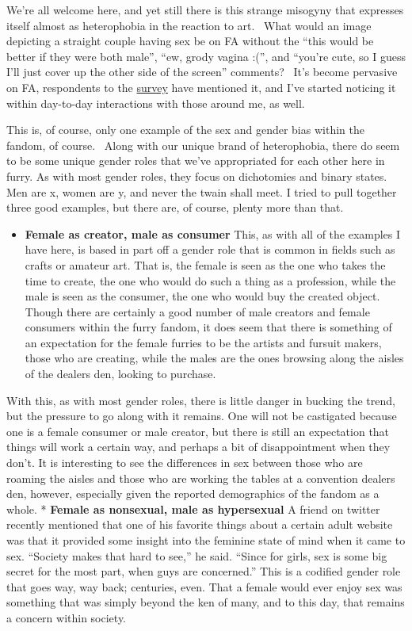 We're all welcome here, and yet still there is this strange misogyny
that expresses itself almost as heterophobia in the reaction to art.
~What would an image depicting a straight couple having sex be on FA
without the ``this would be better if they were both male'', ``ew, grody
vagina :('', and ``you're cute, so I guess I'll just cover up the other
side of the screen'' comments? ~It's become pervasive on FA, respondents
to the
\href{http://survey.adjectivespecies.com/sexuality-and-gender/}{survey}
have mentioned it, and I've started noticing it within day-to-day
interactions with those around me, as well.

This is, of course, only one example of the sex and gender bias within
the fandom, of course. ~Along with our unique brand of heterophobia,
there do seem to be some unique gender roles that we've appropriated for
each other here in furry. As with most gender roles, they focus on
dichotomies and binary states. Men are x, women are y, and never the
twain shall meet. I tried to pull together three good examples, but
there are, of course, plenty more than that.

\begin{itemize}
\tightlist
\item
  \textbf{Female as creator, male as consumer} This, as with all of the
  examples I have here, is based in part off a gender role that is
  common in fields such as crafts or amateur art. That is, the female is
  seen as the one who takes the time to create, the one who would do
  such a thing as a profession, while the male is seen as the consumer,
  the one who would buy the created object. Though there are certainly a
  good number of male creators and female consumers within the furry
  fandom, it does seem that there is something of an expectation for the
  female furries to be the artists and fursuit makers, those who are
  creating, while the males are the ones browsing along the aisles of
  the dealers den, looking to purchase.
\end{itemize}

With this, as with most gender roles, there is little danger in bucking
the trend, but the pressure to go along with it remains. One will not be
castigated because one is a female consumer or male creator, but there
is still an expectation that things will work a certain way, and perhaps
a bit of disappointment when they don't. It is interesting to see the
differences in sex between those who are roaming the aisles and those
who are working the tables at a convention dealers den, however,
especially given the reported demographics of the fandom as a whole. *
\textbf{Female as nonsexual, male as hypersexual} A friend on twitter
recently mentioned that one of his favorite things about a certain adult
website was that it provided some insight into the feminine state of
mind when it came to sex. ``Society makes that hard to see,'' he said.
``Since for girls, sex is some big secret for the most part, when guys
are concerned.'' This is a codified gender role that goes way, way back;
centuries, even. That a female would ever enjoy sex was something that
was simply beyond the ken of many, and to this day, that remains a
concern within society.

